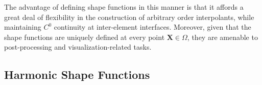 	
	The advantage of defining shape functions in this manner is that it affords a great deal of flexibility in the construction of arbitrary order interpolants, while maintaining $C^0$ continuity at inter-element interfaces. Moreover, given that the shape functions are uniquely defined at every point $\mathbf{X} \in \Omega$, they are amenable to post-processing and visualization-related tasks.
	

\subsection*{Harmonic Shape Functions}


